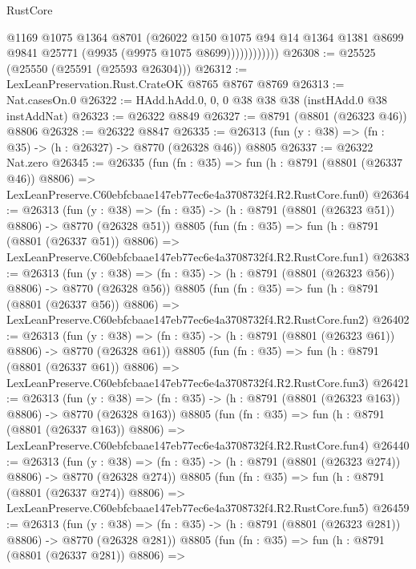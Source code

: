\begin{lexlean}{RustCore}
\begin{coremodule}
                      @1169
                      @1075
                      @1364
                      @8701
                      (@26022
                        @150
                        @1075
                        @94
                        @14
                        @1364
                        @1381
                        @8699
                        @9841
                        @25771
                        (@9935 (@9975 @1075 @8699))))))))))))
@26308 := @25525 (@25550 (@25591 (@25593 @26304)))
@26312 := LexLeanPreservation.Rust.CrateOK @8765 @8767 @8769
@26313 := Nat.casesOn.{0}
@26322 := HAdd.hAdd.{0, 0, 0} @38 @38 @38 (instHAdd.{0} @38 instAddNat)
@26323 := @26322 @8849
@26327 := @8791 (@8801 (@26323 @46)) @8806
@26328 := @26322 @8847
@26335 := @26313 (fun (y : @38) => (fn : @35) -> (h : @26327) -> @8770 (@26328 @46)) @8805
@26337 := @26322 Nat.zero
@26345 := @26335
    (fun (fn : @35) =>
    fun (h : @8791 (@8801 (@26337 @46)) @8806) =>
    LexLeanPreserve.C60ebfcbaae147eb77ec6e4a3708732f4.R2.RustCore.fun0)
@26364 := @26313
    (fun (y : @38) => (fn : @35) -> (h : @8791 (@8801 (@26323 @51)) @8806) -> @8770 (@26328 @51))
    @8805
    (fun (fn : @35) =>
    fun (h : @8791 (@8801 (@26337 @51)) @8806) =>
    LexLeanPreserve.C60ebfcbaae147eb77ec6e4a3708732f4.R2.RustCore.fun1)
@26383 := @26313
    (fun (y : @38) => (fn : @35) -> (h : @8791 (@8801 (@26323 @56)) @8806) -> @8770 (@26328 @56))
    @8805
    (fun (fn : @35) =>
    fun (h : @8791 (@8801 (@26337 @56)) @8806) =>
    LexLeanPreserve.C60ebfcbaae147eb77ec6e4a3708732f4.R2.RustCore.fun2)
@26402 := @26313
    (fun (y : @38) => (fn : @35) -> (h : @8791 (@8801 (@26323 @61)) @8806) -> @8770 (@26328 @61))
    @8805
    (fun (fn : @35) =>
    fun (h : @8791 (@8801 (@26337 @61)) @8806) =>
    LexLeanPreserve.C60ebfcbaae147eb77ec6e4a3708732f4.R2.RustCore.fun3)
@26421 := @26313
    (fun (y : @38) => (fn : @35) -> (h : @8791 (@8801 (@26323 @163)) @8806) -> @8770 (@26328 @163))
    @8805
    (fun (fn : @35) =>
    fun (h : @8791 (@8801 (@26337 @163)) @8806) =>
    LexLeanPreserve.C60ebfcbaae147eb77ec6e4a3708732f4.R2.RustCore.fun4)
@26440 := @26313
    (fun (y : @38) => (fn : @35) -> (h : @8791 (@8801 (@26323 @274)) @8806) -> @8770 (@26328 @274))
    @8805
    (fun (fn : @35) =>
    fun (h : @8791 (@8801 (@26337 @274)) @8806) =>
    LexLeanPreserve.C60ebfcbaae147eb77ec6e4a3708732f4.R2.RustCore.fun5)
@26459 := @26313
    (fun (y : @38) => (fn : @35) -> (h : @8791 (@8801 (@26323 @281)) @8806) -> @8770 (@26328 @281))
    @8805
    (fun (fn : @35) =>
    fun (h : @8791 (@8801 (@26337 @281)) @8806) =>

\end{coremodule}
\end{lexlean}
